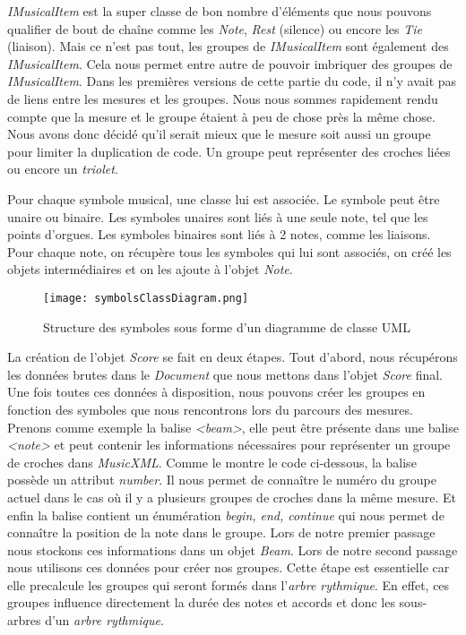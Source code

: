 \par
\emph{IMusicalItem} est la super classe de bon nombre d'éléments que nous pouvons qualifier de bout de chaîne comme les \emph{Note}, \emph{Rest} (silence) ou encore les \emph{Tie} (liaison). Mais ce n'est pas tout, les groupes de \emph{IMusicalItem} sont également des \emph{IMusicalItem}. Cela nous permet entre autre de pouvoir imbriquer des groupes de \emph{IMusicalItem}. Dans les premières versions de cette partie du code, il n'y avait pas de liens entre les mesures et les groupes. Nous nous sommes rapidement rendu compte que la mesure et le groupe étaient à peu de chose près la même chose. Nous avons donc décidé qu'il serait mieux que le mesure soit aussi un groupe pour limiter la duplication de code. Un groupe peut représenter des croches liées ou encore un \emph{triolet}.

\par
Pour chaque symbole musical, une classe lui est associée. Le symbole peut être unaire ou binaire. Les symboles unaires sont liés à une seule note, tel que les points d'orgues. Les symboles binaires sont liés à 2 notes, comme les liaisons. Pour chaque note, on récupère tous les symboles qui lui sont associés, on créé les objets intermédiaires et on les ajoute à l'objet \emph{Note}.


\begin{figure}[!h]
\centering
\texttt{[image: symbolsClassDiagram.png]}\\[1cm]
\caption{Structure des symboles sous forme d'un diagramme de classe UML}
\end{figure}


\par
La création de l'objet \emph{Score} se fait en deux étapes. Tout d'abord, nous récupérons les données brutes dans le \emph{Document} que nous mettons dans l'objet \emph{Score} final. Une fois toutes ces données à disposition, nous pouvons créer les groupes en fonction des symboles que nous rencontrons lors du parcours des mesures. Prenons comme exemple la balise \emph{<beam>}, elle peut être présente dans une balise \emph{<note>} et peut contenir les informations nécessaires pour représenter un groupe de croches dans \emph{MusicXML}. Comme le montre le code ci-dessous, la balise possède un attribut \emph{number}. Il nous permet de connaître le numéro du groupe actuel dans le cas où il y a plusieurs groupes de croches dans la même mesure. Et enfin la balise contient un énumération \emph{begin, end, continue} qui nous permet de connaître la position de la note dans le groupe. Lors de notre premier passage nous stockons ces informations dans un objet \emph{Beam}. Lors de notre second passage nous utilisons ces données pour créer nos groupes. Cette étape est essentielle car elle precalcule les groupes qui seront formés dans l'\emph{arbre rythmique}. En effet, ces groupes influence directement la durée des notes et accords et donc les sous-arbres d'un \emph{arbre rythmique}.


